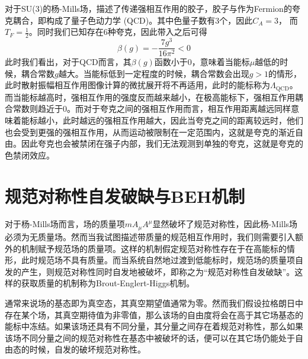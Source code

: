 对于SU(3)的杨-Mills场，描述了传递强相互作用的胶子，胶子与作为Fermion的夸克耦合，即构成了量子色动力学 (QCD)。其中色量子数有3个，因此$C_A=3$， 而$T_F=\frac12$。同时我们已知存在6种夸克，因此带入之后可得
\begin{equation}
    \beta(g) = -\frac{7g^3}{16\pi^2}<0
\end{equation}
此时我们看出，对于QCD而言，其$\beta(g)$函数小于0，意味着当能标$\mu$越低的时候，耦合常数$g$越大。当能标低到一定程度的时候，耦合常数会出现$g>1$的情形，此时散射振幅相互作用图像计算的微扰展开将不再适用，此时的能标称为$\Lambda_\mathrm{QCD}$。而当能标越高时，强相互作用的强度反而越来越小，在极高能标下，强相互作用耦合常数则趋近于0。而对于夸克之间的强相互作用而言，相互作用距离越远同样意味着能标越小，此时越远的强相互作用越大，因此当夸克之间的距离较远时，他们也会受到更强的强相互作用，从而运动被限制在一定范围内，这就是夸克的渐近自由。因此夸克也会被禁闭在强子内部，我们无法观测到单独的夸克，这就是夸克的色禁闭效应。

\section{规范对称性自发破缺与BEH机制}
对于杨-Mills场而言，场的质量项$mA_\mu A^\mu$显然破坏了规范对称性，因此杨-Mills场必须为无质量场。然而当我试图描述带质量的规范相互作用时，我们则需要引入额外的机制赋予规范场的质量项。这样的机制假定规范对称性存在于在高能标的情形，此时规范场不具有质量。而当系统自然地过渡到低能标时，规范场的质量项自发的产生，则规范对称性同时自发地被破坏，即称之为“规范对称性自发破缺”。这样的获取质量的机制称为Brout-Englert-Higgs机制。

通常来说场的基态即为真空态，其真空期望值通常为零。然而我们假设拉格朗日中存在某个场，其真空期待值为非零值，那么该场的自由度将会在高于其它场基态的能标中冻结。如果该场还具有不同分量，其分量之间存在着规范对称性，那么如果该场不同分量之间的规范对称性在基态中被破坏的话，便可以在其它场仍能处于自由态的时候，自发的破坏规范对称性。





